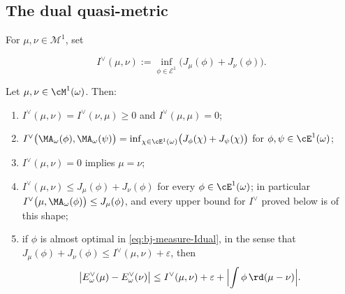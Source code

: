 \subsection{The dual quasi-metric}
\label{sec:ch48-dual-quasimetric}

\begin{definition}
\label{def:bj-measure-quasimetric}
For $\mu,\nu\in\mathcal M^1$, set

\[
 I^\vee(\mu,\nu)
 :=\inf_{\phi\in\mathcal E^1}
       \bigl(J_\mu(\phi)+J_\nu(\phi)\bigr).
\tag{48.4}\label{eq:bj-measure-Idual}
\]
\end{definition}

\begin{proposition}
\label{prop:ch48-Idual-elementary}
Let $\mu,\nu\in\cM^1(\omega)$.  Then:
\begin{enumerate}
\item\label{itm:ch48-Id:sym}
      $I^\vee(\mu,\nu)=I^\vee(\nu,\mu)\ge0$ and
      $I^\vee(\mu,\mu)=0$;
\item\label{itm:ch48-Id:ma}
      $I^\vee\bigl(\MA_\omega(\phi),\MA_\omega(\psi)\bigr)
       =\inf_{\chi\in\cE^1(\omega)}\bigl(J_\phi(\chi)+J_\psi(\chi)\bigr)$
      for $\phi,\psi\in\cE^1(\omega)$;
\item\label{itm:ch48-Id:sep}
      $I^\vee(\mu,\nu)=0$ implies $\mu=\nu$;
\item\label{itm:ch48-Id:upper}
      $I^\vee(\mu,\nu)\le J_\mu(\phi)+J_\nu(\phi)$ for every
      $\phi\in\cE^1(\omega)$; in particular
      $I^\vee\bigl(\mu,\MA_\omega(\phi)\bigr)\le J_\mu(\phi)$, and every
      upper bound for $I^\vee$ proved below is of this shape;
\item\label{itm:ch48-Id:energy}
      if $\phi$ is almost optimal in \eqref{eq:bj-measure-Idual}, in the
      sense that $J_\mu(\phi)+J_\nu(\phi)\le I^\vee(\mu,\nu)+\varepsilon$,
      then
      \[
       \bigl|E^\vee_\omega(\mu)-E^\vee_\omega(\nu)\bigr|
       \le I^\vee(\mu,\nu)+\varepsilon
         +\Bigl|\int\phi\,\rd(\mu-\nu)\Bigr| .
      \]
\end{enumerate}
\end{proposition}

